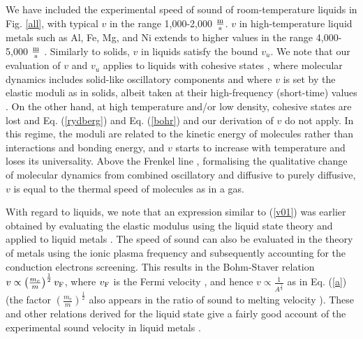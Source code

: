\documentclass[aps,prl,groupedaddress,fleqn,twocolumn,10pt]{revtex4}
\begin{document}
We have included the experimental speed of sound of room-temperature liquids in Fig. \ref{all}, with typical $v$ in the range 1,000-2,000 $\frac{\rm m}{\rm s}$. $v$ in high-temperature liquid metals such as Al, Fe, Mg, and Ni extends to higher values in the range 4,000-5,000 $\frac{\rm m}{\rm s}$ \cite{metals}. Similarly to solids, $v$ in liquids satisfy the bound $v_u$. We note that our evaluation of $v$ and $v_u$ applies to liquids with cohesive states \cite{f2}, where molecular dynamics includes solid-like oscillatory components \cite{frenkel} and where $v$ is set by the elastic moduli as in solids, albeit taken at their high-frequency (short-time) values \cite{frenkel,boon}. On the other hand, at high temperature and/or low density, cohesive states are lost and Eq. (\ref{rydberg}) and Eq. (\ref{bohr}) and our derivation of $v$ do not apply. In this regime, the moduli are related to the kinetic energy of molecules rather than interactions and bonding energy, and $v$ starts to increase with temperature and loses its universality. Above the Frenkel line \cite{f1,f2,f3}, formalising the qualitative change of molecular dynamics from combined oscillatory and diffusive to purely diffusive, $v$ is equal to the thermal speed of molecules as in a gas.

With regard to liquids, we note that an expression similar to (\ref{v01}) was earlier obtained by evaluating the elastic modulus using the liquid state theory and applied to liquid metals \cite{gitis}. The speed of sound can also be evaluated in the theory of metals using the ionic plasma frequency and subsequently accounting for the conduction electrons screening. This results in the Bohm-Staver relation $v\propto\left(\frac{m_e}{m}\right)^{\frac{1}{2}}v_{\rm F}$, where $v_{\rm F}$ is the Fermi velocity \cite{ashcroft}, and hence $v\propto\frac{1}{A^\frac{1}{2}}$ as in Eq. (\ref{a}) (the factor $\left(\frac{m_e}{m}\right)^{\frac{1}{2}}$ also appears in the ratio of sound to melting velocity \cite{hartnoll1}). These and other relations derived for the liquid state give a fairly good account of the experimental sound velocity in liquid metals \cite{gitis,metals}.
\end{document}
